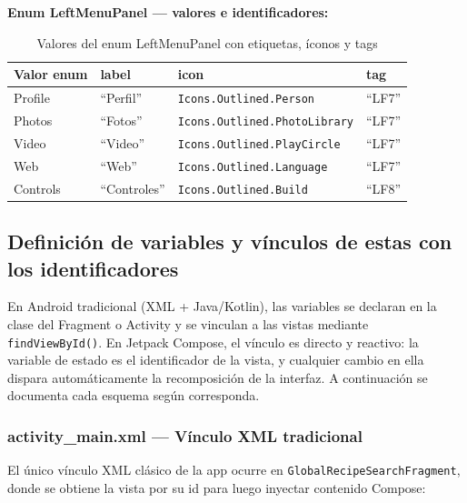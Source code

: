 \documentclass[stu, 12pt, letterpaper, donotrepeattitle, floatsintext, natbib]{apa7}
\begin{document}
\noindent\textbf{Enum LeftMenuPanel --- valores e identificadores:}

\begin{table}[H]
\caption{Valores del enum LeftMenuPanel con etiquetas, íconos y tags}
\label{tab:enumleftmenu}
\begin{tabularx}{\textwidth}{@{}llXl@{}}
\toprule
\textbf{Valor enum} & \textbf{label} & \textbf{icon} & \textbf{tag} \\
\midrule
Profile & ``Perfil'' & \texttt{Icons.Outlined.Person} & ``LF7'' \\[3pt]
Photos & ``Fotos'' & \texttt{Icons.Outlined.PhotoLibrary} & ``LF7'' \\[3pt]
Video & ``Video'' & \texttt{Icons.Outlined.PlayCircle} & ``LF7'' \\[3pt]
Web & ``Web'' & \texttt{Icons.Outlined.Language} & ``LF7'' \\[3pt]
Controls & ``Controles'' & \texttt{Icons.Outlined.Build} & ``LF8'' \\
\bottomrule
\end{tabularx}
\end{table}

\subsection{Definición de variables y vínculos de estas con los identificadores}
\label{sec:variables}

En Android tradicional (XML + Java/Kotlin), las variables se declaran en la clase del
Fragment o Activity y se vinculan a las vistas mediante \texttt{findViewById()}. En
Jetpack Compose, el vínculo es directo y reactivo: la variable de estado es el
identificador de la vista, y cualquier cambio en ella dispara automáticamente la
recomposición de la interfaz. A continuación se documenta cada esquema según corresponda.

\subsubsection{activity\_main.xml --- Vínculo XML tradicional}

El único vínculo XML clásico de la app ocurre en \texttt{GlobalRecipeSearchFragment},
donde se obtiene la vista por su id para luego inyectar contenido Compose:
\end{document}
